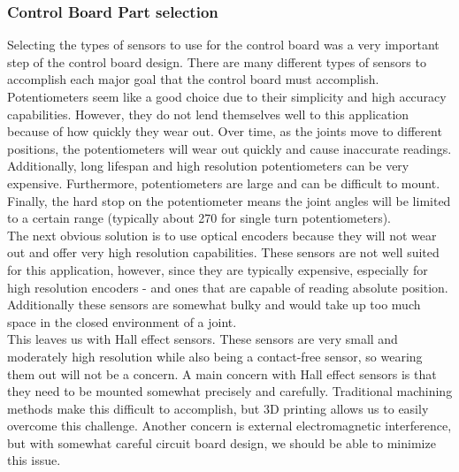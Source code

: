 \subsubsection{Control Board Part selection}
Selecting the types of sensors to use for the control board was a very important step of the control board design. There are many different types of sensors to accomplish each major goal that the control board must accomplish.
Potentiometers seem like a good choice due to their simplicity and high accuracy capabilities. However, they do not lend themselves well to this application because of how quickly they wear out. Over time, as the joints move to different positions, the potentiometers will wear out quickly and cause inaccurate readings. Additionally, long lifespan and high resolution potentiometers can be very expensive. Furthermore, potentiometers are large and can be difficult to mount. Finally, the hard stop on the potentiometer means the joint angles will be limited to a certain range (typically about 270 \textdegree  for single turn potentiometers).\\
\newline
The next obvious solution is to use optical encoders because they will not wear out and offer very high resolution capabilities. These sensors are not well suited for this application, however, since they are typically expensive, especially for high resolution encoders - and ones that are capable of reading absolute position. Additionally these sensors are somewhat bulky and would take up too much space in the closed environment of a joint. \\
\newline
This leaves us with Hall effect sensors. These sensors are very small and moderately high resolution while also being a contact-free sensor, so wearing them out will not be a concern. A main concern with Hall effect sensors is that they need to be mounted somewhat precisely and carefully. Traditional machining methods make this difficult to accomplish, but 3D printing allows us to easily overcome this challenge.  Another concern is external electromagnetic interference, but with somewhat careful circuit board design, we should be able to minimize this issue.

